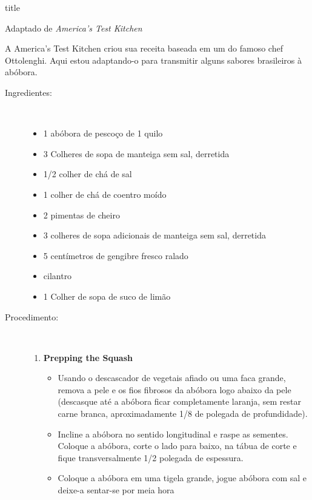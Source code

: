 \documentclass [11pt, letterpaper] {article}
\begin{document}
 {title}

\begin {flushright}
Adaptado de {\it America's Test Kitchen}
\end {flushright}

A America's Test Kitchen criou sua receita baseada em um do famoso chef Ottolenghi. Aqui estou adaptando-o para transmitir alguns sabores brasileiros à abóbora.

\vspace {0.3in}

\begin {description}

\item [Ingredientes:] \ \\
\begin {itemize}
\item 1 abóbora de pesco\c{c}o de 1 quilo
\item 3 Colheres de sopa de manteiga sem sal, derretida
\item 1/2 colher de chá de sal
\item 1 colher de chá de coentro moído
\item 2 pimentas de cheiro
\item 3 colheres de sopa adicionais de manteiga sem sal, derretida
\item 5 cent\'imetros de gengibre fresco ralado
\item cilantro
\item 1 Colher de sopa de suco de limão
\end {itemize}

\item [Procedimento:] \ \\

\begin {enumerate}
\item {\bf Prepping the Squash}
\begin {itemize}
\item Usando o descascador de vegetais afiado ou uma faca grande, remova a pele e os fios fibrosos da abóbora logo abaixo da pele (descasque até a abóbora ficar completamente laranja, sem restar carne branca, aproximadamente 1/8 de polegada de profundidade).
\item Incline a abóbora no sentido longitudinal e raspe as sementes. Coloque a abóbora, corte o lado para baixo, na tábua de corte e fique transversalmente 1/2 polegada de espessura.
\item Coloque a abóbora em uma tigela grande, jogue abóbora com sal e deixe-a sentar-se por meia hora
\end {itemize}


\end{enumerate}
\end{description}
\end{document}
